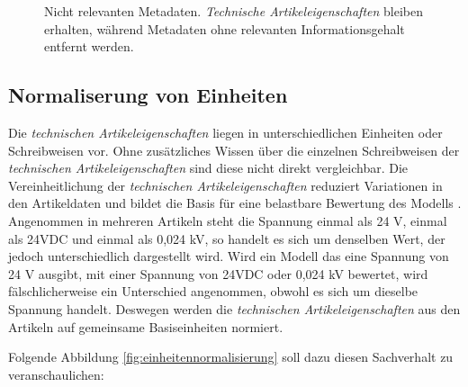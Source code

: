 \begin{figure}[H]
\begin{tikzpicture}
        \end{tikzpicture} 
        \caption{Nicht relevanten Metadaten. \textit{Technische Artikeleigenschaften} bleiben erhalten, während Metadaten ohne relevanten Informationsgehalt entfernt werden.} 
        \label{fig:metadaten_filter} 
        \end{figure}


\subsection{Normaliserung von Einheiten} 
\label{sec:normaliserung_von_einheiten}

Die \textit{technischen Artikeleigenschaften} liegen in unterschiedlichen Einheiten oder Schreibweisen vor.
Ohne zusätzliches Wissen über die einzelnen Schreibweisen der \textit{technischen Artikeleigenschaften} sind diese nicht direkt vergleichbar. 
Die Vereinheitlichung der \textit{technischen Artikeleigenschaften} reduziert Variationen in den Artikeldaten und bildet die Basis für eine belastbare Bewertung des Modells \cite{hastie2009elements}. 
Angenommen in mehreren Artikeln steht die Spannung einmal als 24 V, einmal als 24VDC und einmal als 0,024 kV, so handelt es sich um denselben Wert, der jedoch unterschiedlich dargestellt wird.
Wird ein Modell das eine Spannung von 24 V ausgibt, mit einer Spannung von 24VDC oder 0,024 kV bewertet, wird fälschlicherweise ein Unterschied angenommen, obwohl es sich um dieselbe Spannung handelt.
Deswegen werden die \textit{technischen Artikeleigenschaften} aus den Artikeln auf gemeinsame Basiseinheiten normiert.

Folgende Abbildung \ref{fig:einheitennormalisierung} soll dazu diesen Sachverhalt zu veranschaulichen:

